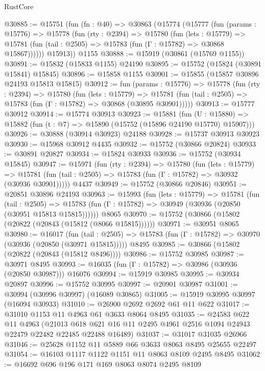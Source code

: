 \begin{lexlean}{RustCore}
\begin{coremodule}
@30885 := @15751
    (fun (fn : @40) =>
    @30863
      (@15774
        (@15777
          (fun (params : @15776) =>
          @15778
            (fun (rty : @2394) =>
            @15780
              (fun (lets : @15779) =>
              @15781 (fun (tail : @2505) => @15783 (fun (Γ : @15782) => @30868 @15867))))))
        @15913))
    @1155
@30888 := @15919 (@30861 (@15769 @1155))
@30891 := @15832 (@15833 @1155) @24190
@30895 := @15752 (@15824 (@30891 @15841) @15845)
@30896 := @15858 @1155
@30901 := @15855 (@15857 @30896 @24193 @15813 @15815)
@30912 := fun (params : @15776) =>
  @15778
    (fun (rty : @2394) =>
    @15780
      (fun (lets : @15779) =>
      @15781 (fun (tail : @2505) => @15783 (fun (Γ : @15782) => @30868 (@30895 @30901)))))
@30913 := @15777 @30912
@30914 := @15774 @30913
@30923 := @15881
    (fun (U : @15880) => @15882 (fun (t : @7) => @15890 (@15752 (@15896 @24190 @15770) @15907)))
@30926 := @30888 (@30914 @30923) @24188
@30928 := @15737 @30913 @30923
@30930 := @15968 @30912 @4435
@30932 := @15752 (@30866 @20824)
@30933 := @30891 @20827
@30934 := @15824 @30933
@30936 := @15752 (@30934 @15845)
@30947 := @15971
    (fun (rty : @2394) =>
    @15780
      (fun (lets : @15779) =>
      @15781 (fun (tail : @2505) => @15783 (fun (Γ : @15782) => @30932 (@30936 @30901)))))
    @4437
@30949 := @15752 (@30866 @20846)
@30951 := @20851 @30896 @24193
@30963 := @15993
    (fun (lets : @15779) =>
    @15781
      (fun (tail : @2505) =>
      @15783 (fun (Γ : @15782) => @30949 (@30936 (@20850 (@30951 @15813 @15815))))))
    @8065
@30970 := @15752 (@30866 (@15802 (@20822 (@20843 (@15812 (@8066 @15815))))))
@30971 := @30951 @8065
@30980 := @16017
    (fun (tail : @2505) => @15783 (fun (Γ : @15782) => @30970 (@30936 (@20850 (@30971 @15815)))))
    @8495
@30985 := @30866 (@15802 (@20822 (@20843 (@15812 @8496))))
@30986 := @15752 @30985
@30987 := @30971 @8495
@30993 := @16035 (fun (Γ : @15782) => @30986 (@30936 (@20850 @30987))) @16076
@30994 := @15919 @30985
@30995 := @30934 @20897
@30996 := @15752 @30995
@30997 := @20901 @30987
@31001 := @30994 (@30996 @30997) (@16089 @30865)
@31005 := @15919 @30995 @30997 (@16094 @30933)
@31010 := @26900 @2692 @2692 @61 @11 @622
@31017 := @31010 @1153 @11 @4963 @61 @3633 @8064 @8495
@31035 := @24583
    @622
    @11
    @4963
    (@21013 @618 @621 @16 @11 @2495 @4961 @2516 @1094 @24943 @22479 @22482 @22485 @22488 @16489)
@31037 := @31017 @31035 @26966
@31046 := @25628 @1152 @11 @5889 @66 @3633 @8063 @8495 @25655 @22497
@31054 := @16103 @1117 @1122 @1151 @11 @8063 @8109 @2495 @8495
@31062 := @16692 @696 @196 @171 @169 @8063 @8074 @2495 @8109

\end{coremodule}
\end{lexlean}
